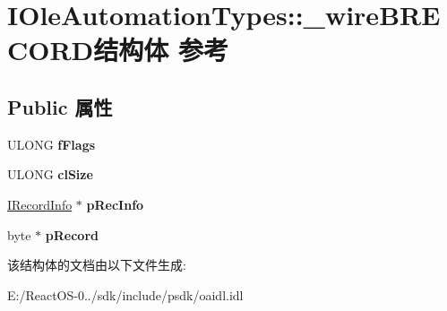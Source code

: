 \hypertarget{struct_i_ole_automation_types_1_1__wire_b_r_e_c_o_r_d}{}\section{I\+Ole\+Automation\+Types\+:\+:\+\_\+wire\+B\+R\+E\+C\+O\+R\+D结构体 参考}
\label{struct_i_ole_automation_types_1_1__wire_b_r_e_c_o_r_d}
\subsection*{Public 属性}
\begin{DoxyCompactItemize}
\item 
\mbox{\label{struct_i_ole_automation_types_1_1__wire_b_r_e_c_o_r_d_a3a5df432086b66259f8d31f741a1882f}} 
U\+L\+O\+NG {\bfseries f\+Flags}
\item 
\mbox{\label{struct_i_ole_automation_types_1_1__wire_b_r_e_c_o_r_d_a8b4974ab1d075629f39cee5dc38709b3}} 
U\+L\+O\+NG {\bfseries cl\+Size}
\item 
\mbox{\label{struct_i_ole_automation_types_1_1__wire_b_r_e_c_o_r_d_abb2158982727a840351bf6f3ae080548}} 
\hyperlink{interface_i_record_info}{I\+Record\+Info} $\ast$ {\bfseries p\+Rec\+Info}
\item 
\mbox{\label{struct_i_ole_automation_types_1_1__wire_b_r_e_c_o_r_d_a2c64208b4ab4b098968280b671acb92e}} 
byte $\ast$ {\bfseries p\+Record}
\end{DoxyCompactItemize}


该结构体的文档由以下文件生成\+:\begin{DoxyCompactItemize}
\item 
E\+:/\+React\+O\+S-\/0../sdk/include/psdk/oaidl.\+idl\end{DoxyCompactItemize}
